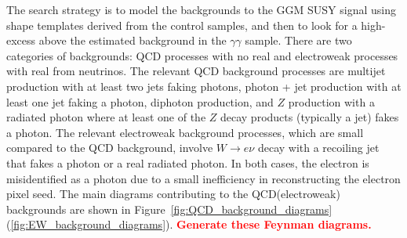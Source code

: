 \documentclass[dissertation.tex]{subfiles}
\begin{document}
The search strategy is to model the backgrounds to the GGM SUSY signal using \MET shape templates derived from the control samples, and then to look for a high-\MET excess above the estimated background in the $\gamma\gamma$ sample.  There are two categories of backgrounds: QCD processes with no real \MET and electroweak processes with real \MET from neutrinos.  The relevant QCD background processes are multijet production with at least two jets faking photons, photon + jet production with at least one jet faking a photon, diphoton production, and $Z$ production with a radiated photon where at least one of the $Z$ decay products (typically a jet) fakes a photon.  The relevant electroweak background processes, which are small compared to the QCD background, involve $W\rightarrow e\nu$ decay with a recoiling jet that fakes a photon or a real radiated photon.  In both cases, the electron is misidentified as a photon due to a small inefficiency in reconstructing the electron pixel seed.  The main diagrams contributing to the QCD(electroweak) backgrounds are shown in Figure~\ref{fig:QCD_background_diagrams}(\ref{fig:EW_background_diagrams}).  \textcolor{red}{\textbf{Generate these Feynman diagrams.}}

%

\end{document}
